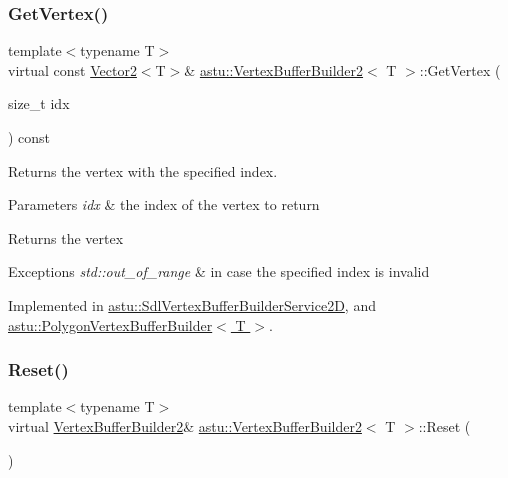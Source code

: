 \subsubsection{\texorpdfstring{Get\+Vertex()}{GetVertex()}}
{\footnotesize\ttfamily template$<$typename T$>$ \\
virtual const \hyperlink{classastu_1_1Vector2}{Vector2}$<$T$>$\& \hyperlink{classastu_1_1VertexBufferBuilder2}{astu\+::\+Vertex\+Buffer\+Builder2}$<$ T $>$\+::Get\+Vertex (\begin{DoxyParamCaption}\item[{size\+\_\+t}]{idx }\end{DoxyParamCaption}) const\hspace{0.3cm}{\ttfamily [pure virtual]}}

Returns the vertex with the specified index.


\begin{DoxyParams}{Parameters}
{\em idx} & the index of the vertex to return\\
\hline
\end{DoxyParams}
\begin{DoxyReturn}{Returns}
the vertex 
\end{DoxyReturn}

\begin{DoxyExceptions}{Exceptions}
{\em std\+::out\+\_\+of\+\_\+range} & in case the specified index is invalid \\
\hline
\end{DoxyExceptions}


Implemented in \hyperlink{classastu_1_1SdlVertexBufferBuilderService2D_aaf43c4425363ccb8db57bb8963072a7f}{astu\+::\+Sdl\+Vertex\+Buffer\+Builder\+Service2D}, and \hyperlink{classastu_1_1PolygonVertexBufferBuilder_ac8ae6ab6039dde91530a79000ac3da3e}{astu\+::\+Polygon\+Vertex\+Buffer\+Builder$<$ T $>$}.

\mbox{\label{classastu_1_1VertexBufferBuilder2_a13de4c923fb8e44b99f6cd36430dd369}} 
\subsubsection{\texorpdfstring{Reset()}{Reset()}}
{\footnotesize\ttfamily template$<$typename T$>$ \\
virtual \hyperlink{classastu_1_1VertexBufferBuilder2}{Vertex\+Buffer\+Builder2}\& \hyperlink{classastu_1_1VertexBufferBuilder2}{astu\+::\+Vertex\+Buffer\+Builder2}$<$ T $>$\+::Reset (\begin{DoxyParamCaption}{ }\end{DoxyParamCaption})\hspace{0.3cm}{\ttfamily [pure virtual]}}

